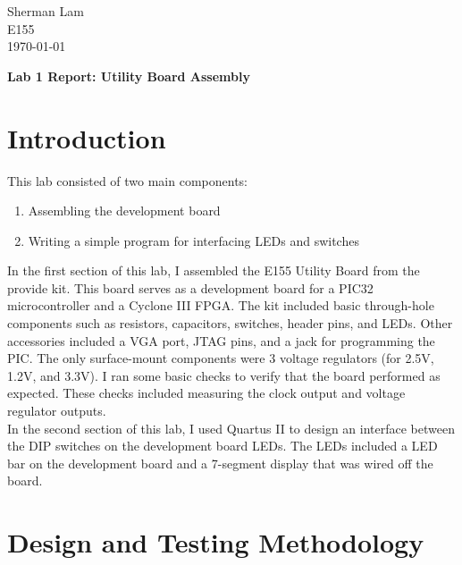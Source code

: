 \documentclass[11pt]{article}
\begin{document}
\begin{flushleft}
Sherman Lam
\\E155
\\ \today
\end{flushleft}


\begin{center}
\begin{Large}
\textbf{Lab 1 Report: Utility Board Assembly}
\end{Large}
\end{center}




\section{Introduction}
\label{sec:intro}

This lab consisted of two main components: 
	\begin{enumerate} \itemsep0pt
		\item Assembling the development board
		\item Writing a simple program for interfacing LEDs and switches
	\end{enumerate}

In the first section of this lab, I assembled the E155 Utility Board from the provide kit. This board serves as a development board for a PIC32 microcontroller and a Cyclone III FPGA. The kit included basic through-hole components such as resistors, capacitors, switches, header pins, and LEDs. Other accessories included a VGA port, JTAG pins, and a jack for programming the PIC. The only surface-mount components were 3 voltage regulators (for 2.5V, 1.2V, and 3.3V). I ran some basic checks to verify that the board performed as expected. These checks included measuring the clock output and voltage regulator outputs.\\

In the second section of this lab, I used Quartus II to design an interface between the DIP switches on the development board LEDs. The LEDs included a LED bar on the development board and a 7-segment display that was wired off the board.


\section{Design and Testing Methodology}
\end{document}
